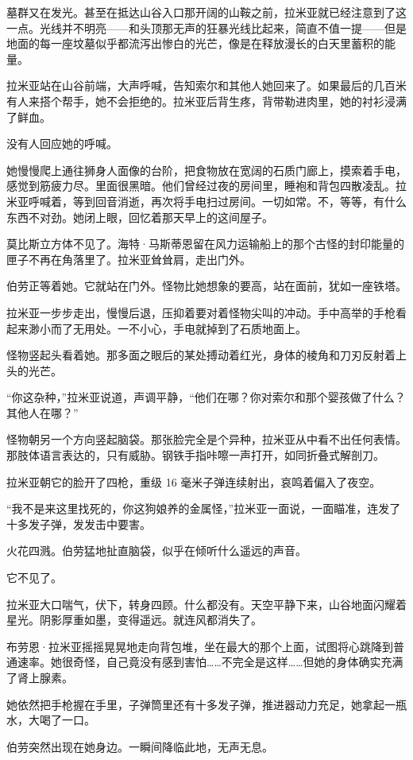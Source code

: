 \documentclass[AutoFakeBold=true]{book}
\begin{document}
墓群又在发光。甚至在抵达山谷入口那开阔的山鞍之前，拉米亚就已经注意到了这一点。光线并不明亮——和头顶那无声的狂暴光线比起来，简直不值一提——但是地面的每一座坟墓似乎都流泻出惨白的光芒，像是在释放漫长的白天里蓄积的能量。

拉米亚站在山谷前端，大声呼喊，告知索尔和其他人她回来了。如果最后的几百米有人来搭个帮手，她不会拒绝的。拉米亚后背生疼，背带勒进肉里，她的衬衫浸满了鲜血。

没有人回应她的呼喊。

她慢慢爬上通往狮身人面像的台阶，把食物放在宽阔的石质门廊上，摸索着手电，感觉到筋疲力尽。里面很黑暗。他们曾经过夜的房间里，睡袍和背包四散凌乱。拉米亚呼喊着，等到回音消逝，再次将手电扫过房间。一切如常。不，等等，{\kaishu 有什么东西}不对劲。她闭上眼，回忆着那天早上的这间屋子。

莫比斯立方体不见了。海特·马斯蒂恩留在风力运输船上的那个古怪的封印能量的匣子不再在角落里了。拉米亚耸耸肩，走出门外。

伯劳正等着她。它就站在门外。怪物比她想象的要高，站在面前，犹如一座铁塔。

拉米亚一步步走出，慢慢后退，压抑着要对着怪物尖叫的冲动。手中高举的手枪看起来渺小而了无用处。一不小心，手电就掉到了石质地面上。

怪物竖起头看着她。那多面之眼后的某处搏动着红光，身体的棱角和刀刃反射着上头的光芒。

``你这杂种，''拉米亚说道，声调平静，``他们在哪？你对索尔和那个婴孩做了什么？其他人在哪？''

怪物朝另一个方向竖起脑袋。那张脸完全是个异种，拉米亚从中看不出任何表情。那肢体语言表达的，只有威胁。钢铁手指咔嚓一声打开，如同折叠式解剖刀。

拉米亚朝它的脸开了四枪，重级 16 毫米子弹连续射出，哀鸣着偏入了夜空。

``我不是来这里找死的，你这狗娘养的金属怪，''拉米亚一面说，一面瞄准，连发了十多发子弹，发发击中要害。

火花四溅。伯劳猛地扯直脑袋，似乎在倾听什么遥远的声音。

它不见了。

拉米亚大口喘气，伏下，转身四顾。什么都没有。天空平静下来，山谷地面闪耀着星光。阴影厚重如墨，变得遥远。就连风都消失了。

布劳恩·拉米亚摇摇晃晃地走向背包堆，坐在最大的那个上面，试图将心跳降到普通速率。她很奇怪，自己竟没有感到害怕……不完全是这样……但她的身体确实充满了肾上腺素。

她依然把手枪握在手里，子弹筒里还有十多发子弹，推进器动力充足，她拿起一瓶水，大喝了一口。

伯劳突然出现在她身边。一瞬间降临此地，无声无息。
\end{document}
